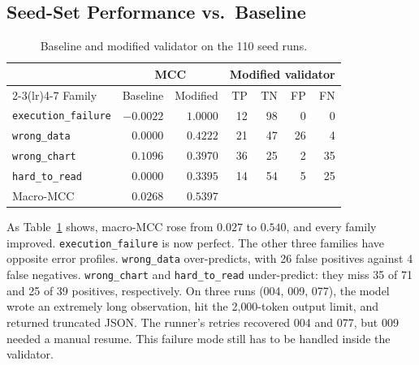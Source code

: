\documentclass[11pt]{article}
\begin{document}
\subsection{Seed-Set Performance vs.\ Baseline}

\begin{table}[h]
\centering
\begin{tabular}{lrrrrrr}
\toprule
& \multicolumn{2}{c}{MCC} & \multicolumn{4}{c}{Modified validator} \\
\cmidrule(lr){2-3}\cmidrule(lr){4-7}
Family & Baseline & Modified & TP & TN & FP & FN \\
\midrule
\texttt{execution\_failure} & $-0.0022$ & $1.0000$ & 12 & 98 & 0  & 0  \\
\texttt{wrong\_data}        & $0.0000$  & $0.4222$ & 21 & 47 & 26 & 4  \\
\texttt{wrong\_chart}       & $0.1096$  & $0.3970$ & 36 & 25 & 2  & 35 \\
\texttt{hard\_to\_read}     & $0.0000$  & $0.3395$ & 14 & 54 & 5  & 25 \\
\midrule
Macro-MCC & $0.0268$ & $0.5397$ & & & & \\
\bottomrule
\end{tabular}
\caption{Baseline and modified validator on the 110 seed runs.}
\label{tab:part2}
\end{table}

As Table~\ref{tab:part2} shows, macro-MCC rose from $0.027$ to $0.540$, and
every family improved. \texttt{execution\_failure} is now perfect. The other
three families have opposite error profiles. \texttt{wrong\_data} over-predicts,
with 26 false positives against 4 false negatives. \texttt{wrong\_chart} and
\texttt{hard\_to\_read} under-predict: they miss 35 of 71 and 25 of 39 positives,
respectively. On three runs (004, 009, 077), the model wrote an extremely long
observation, hit the 2{,}000-token output limit, and returned truncated JSON.
The runner's retries recovered 004 and 077, but 009 needed a manual resume. This
failure mode still has to be handled inside the validator.
\end{document}
